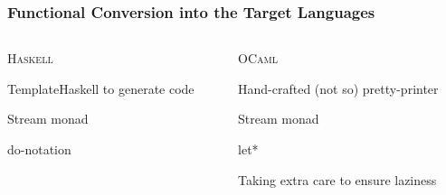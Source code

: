 \documentclass[xcolor=table, aspectratio=169]{beamer}
\newcommand{\ocaml}{\textsc{OCaml}\xspace}
\newcommand{\haskell}{\textsc{Haskell}\xspace}
\begin{document}
\begin{frame}[fragile]
  \frametitle{Functional Conversion into the Target Languages}
\begin{columns}
  \begin{column}[t]{0.45\textwidth}

\begin{center}
  \haskell
\end{center}

\begin{center}
  TemplateHaskell to generate code
\end{center}

\begin{center}
  Stream monad
\end{center}

\begin{center}
  do-notation
\end{center}

\begin{center}

\end{center}

  \end{column}
  \begin{column}[t]{0.45\textwidth}
\begin{center}
  \ocaml
\end{center}
\begin{center}
  Hand-crafted (not so) pretty-printer
\end{center}

\begin{center}
  Stream monad
\end{center}

\begin{center}
  let*
\end{center}

\begin{center}
  Taking extra care to ensure laziness
\end{center}

  \end{column}
\end{columns}

\end{frame}
\end{document}
